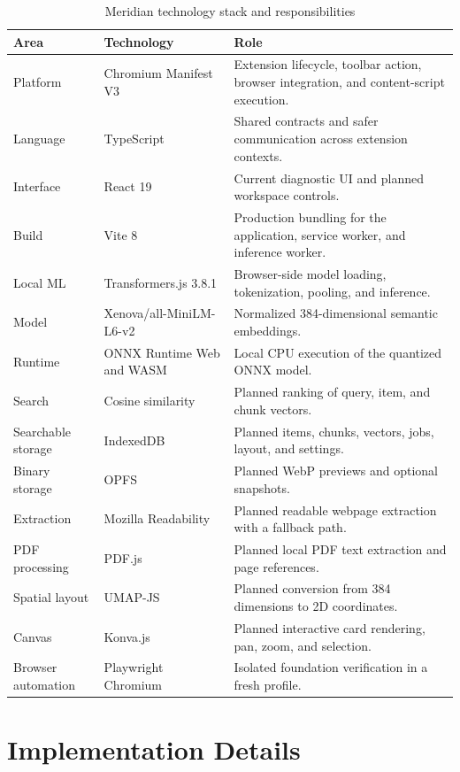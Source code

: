 \documentclass{tietreport}
\begin{document}
\begin{table}[htbp]
\centering
\small
\begin{tabularx}{\textwidth}{@{}p{}YY@{}}
\toprule
\textbf{Area} & \textbf{Technology} & \textbf{Role} \\
\midrule
Platform & Chromium Manifest V3 & Extension lifecycle, toolbar action, browser integration,
and content-script execution. \\
Language & TypeScript & Shared contracts and safer communication across extension contexts. \\
Interface & React 19 & Current diagnostic UI and planned workspace controls. \\
Build & Vite 8 & Production bundling for the application, service worker, and inference worker. \\
Local ML & Transformers.js 3.8.1 & Browser-side model loading, tokenization, pooling, and inference. \\
Model & Xenova/all-MiniLM-L6-v2 & Normalized 384-dimensional semantic embeddings. \\
Runtime & ONNX Runtime Web and WASM & Local CPU execution of the quantized ONNX model. \\
Search & Cosine similarity & Planned ranking of query, item, and chunk vectors. \\
Searchable storage & IndexedDB & Planned items, chunks, vectors, jobs, layout, and settings. \\
Binary storage & OPFS & Planned WebP previews and optional snapshots. \\
Extraction & Mozilla Readability & Planned readable webpage extraction with a fallback path. \\
PDF processing & PDF.js & Planned local PDF text extraction and page references. \\
Spatial layout & UMAP-JS & Planned conversion from 384 dimensions to 2D coordinates. \\
Canvas & Konva.js & Planned interactive card rendering, pan, zoom, and selection. \\
Browser automation & Playwright Chromium & Isolated foundation verification in a fresh profile. \\
\bottomrule
\end{tabularx}
\caption{Meridian technology stack and responsibilities}
\label{tab:stack}
\end{table}

\section{Implementation Details}
\end{document}
